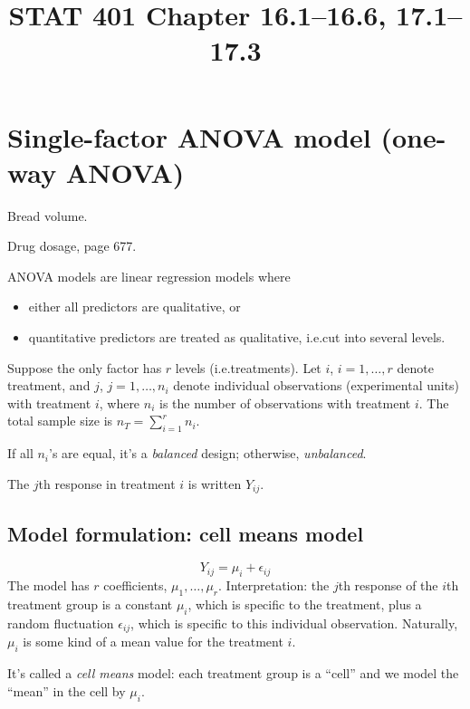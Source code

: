 \documentclass[12pt]{article}
\begin{document}
\title{STAT 401 Chapter 16.1--16.6, 17.1--17.3}
\maketitle

\section{Single-factor ANOVA model (one-way ANOVA)}

\example Bread volume.

\example Drug dosage, page 677.

ANOVA models are linear regression models where
\begin{itemize}
\item either all predictors are qualitative, or
\item quantitative predictors are treated as qualitative,
    i.e.\@ cut into several levels.
\end{itemize}

Suppose the only factor has $r$ levels (i.e.\@ treatments).
Let $i$, $i=1,\dotsc,r$ denote treatment, and
$j$, $j=1,\dotsc,n_i$ denote individual observations (experimental
units) with treatment $i$, where $n_i$ is the number of observations
with treatment $i$.
The total sample size is $n_T = \sum_{i=1}^r n_i$.

If all $n_i$'s are equal, it's a \emph{balanced} design;
otherwise, \emph{unbalanced}.

The $j$th response in treatment $i$ is written
$Y_{ij}$.

\subsection{Model formulation: cell means model}

\[
Y_{ij} = \mu_i + \epsilon_{ij}
\]
The model has $r$ coefficients, $\mu_1,\dotsc,\mu_r$.
Interpretation:
the $j$th response of the $i$th treatment group
is a constant $\mu_i$, which is specific to the treatment,
plus a random fluctuation $\epsilon_{ij}$,
which is specific to this individual observation.
Naturally, $\mu_i$ is some kind of a mean value for the treatment $i$.

It's called a \emph{cell means} model:
each treatment group is a ``cell'' and we model the ``mean'' in the cell
by $\mu_i$.
\end{document}
